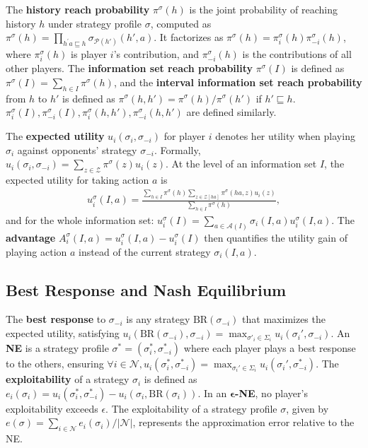 \documentclass[letterpaper]{article} %
\makeatletter
\renewenvironment{align*}{%
  \linenomath 
  \start@align\@ne\st@rredtrue\m@ne
}{%
  \endalign
  \endlinenomath 
}
\makeatother
\begin{document}
The \textbf{history reach probability} $\pi^\sigma(h)$ is the joint probability of reaching history $h$ under strategy profile $\sigma$, computed as $\pi^\sigma(h)=\prod_{h^\prime a \sqsubseteq h}\sigma_{\mathcal{P}(h')}(h',a)$. It factorizes as $\pi^\sigma(h)=\pi^\sigma_i(h)\pi^{\sigma}_{-i}(h)$, where $\pi^\sigma_i(h)$ is player $i$'s contribution, and $\pi^{\sigma}_{-i}(h)$ is the contributions of all other players. The \textbf{information set reach probability} $\pi^\sigma(I)$ is defined as $\pi^\sigma(I)=\sum_{h \in I}^{}\pi^\sigma(h)$, and the \textbf{interval information set reach probability} from $h$ to $h'$ is defined as $\pi^\sigma(h,h')=\pi^\sigma(h) / \pi^\sigma(h')$ if $h' \sqsubseteq h$.  $\pi_i^\sigma(I), \pi^\sigma_{-i}(I), \pi^\sigma_{i}(h, h'), \pi^\sigma_{-i}(h, h')$ are defined similarly.

The \textbf{expected utility} $u_i(\sigma_i, \sigma_{-i})$ for player $i$ denotes her utility when playing $\sigma_i$ against opponents' strategy $\sigma_{-i}$. Formally, $u_i(\sigma_i, \sigma_{-i}) = \sum_{z \in \mathcal{Z}}^{}\pi^\sigma(z)u_i(z)$.
At the level of an information set $I$, the expected utility for taking action $a$ is 
\begin{align*}
    u_i^\sigma(I, a) =\frac{\sum_{h \in I}^{}\pi^\sigma(h)\sum_{z \in \mathcal{Z}[ha]}^{}\pi^{\sigma}(ha, z)u_i(z) }{\sum_{h \in I}{\pi^\sigma(h)}}, 
\end{align*}
and for the whole information set: $u_i^\sigma(I) = \sum_{a\in \mathcal{A}(I)}^{}\sigma_i(I,a)u_i^\sigma(I, a)$. The \textbf{advantage} $A_i^\sigma(I, a) = u_i^\sigma(I, a) - u_i^\sigma(I)$ then quantifies the utility gain of playing action $a$ instead of the current strategy $\sigma_i(I, a)$.

\subsection{Best Response and Nash Equilibrium}
The \textbf{best response} to $\sigma_{-i}$ is any strategy $\text{BR}(\sigma_{-i})$ that maximizes the expected utility, satisfying $u_i(\text{BR}(\sigma_{-i}), \sigma_{-i})=\max_{\sigma'_{i}\in\Sigma_i}u_i(\sigma_i', \sigma_{-i})$. An \textbf{NE} is a strategy profile $\sigma^*=\left(\sigma_i^*, \sigma_{-i}^*\right)$ where each player plays a best response to the others, ensuring $\forall i\in\mathcal{N}, u_i(\sigma_i^*, \sigma_{-i}^*) = \max_{\sigma_i'\in \Sigma_i}u_i(\sigma_i', \sigma_{-i}^*)$. The \textbf{exploitability} of a strategy $\sigma_i$ is defined as $e_i(\sigma_i) = u_i(\sigma_i^*, \sigma_{-i}^*) - u_i(\sigma_i, \text{BR}(\sigma_i))$. In an $\boldsymbol{\epsilon}$\textbf{-NE}, no player's exploitability exceeds $\epsilon$. The exploitability of a strategy profile $\sigma$, given by $e(\sigma)=\sum_{i\in\mathcal{N}}e_i(\sigma_i)/|\mathcal{N}|$, represents the approximation error relative to the NE.
\end{document}
